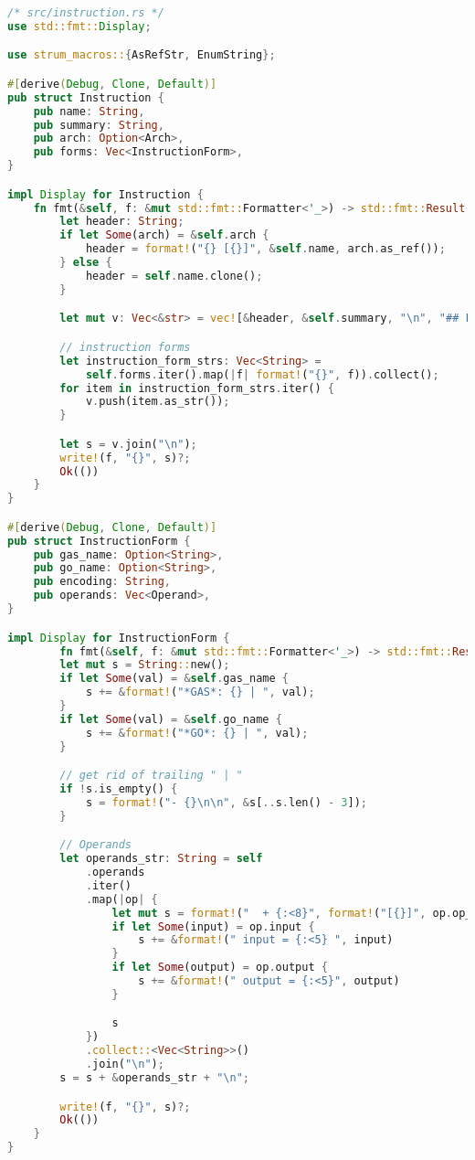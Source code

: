 \begin{lstlisting}[language=rust]
/* src/instruction.rs */
use std::fmt::Display;

use strum_macros::{AsRefStr, EnumString};

#[derive(Debug, Clone, Default)]
pub struct Instruction {
    pub name: String,
    pub summary: String,
    pub arch: Option<Arch>,
    pub forms: Vec<InstructionForm>,
}

impl Display for Instruction {
    fn fmt(&self, f: &mut std::fmt::Formatter<'_>) -> std::fmt::Result {
        let header: String;
        if let Some(arch) = &self.arch {
            header = format!("{} [{}]", &self.name, arch.as_ref());
        } else {
            header = self.name.clone();
        }

        let mut v: Vec<&str> = vec![&header, &self.summary, "\n", "## Forms", "\n"];

        // instruction forms
        let instruction_form_strs: Vec<String> =
            self.forms.iter().map(|f| format!("{}", f)).collect();
        for item in instruction_form_strs.iter() {
            v.push(item.as_str());
        }

        let s = v.join("\n");
        write!(f, "{}", s)?;
        Ok(())
    }
}

#[derive(Debug, Clone, Default)]
pub struct InstructionForm {
    pub gas_name: Option<String>,
    pub go_name: Option<String>,
    pub encoding: String,
    pub operands: Vec<Operand>,
}

impl Display for InstructionForm {
        fn fmt(&self, f: &mut std::fmt::Formatter<'_>) -> std::fmt::Result {
        let mut s = String::new();
        if let Some(val) = &self.gas_name {
            s += &format!("*GAS*: {} | ", val);
        }
        if let Some(val) = &self.go_name {
            s += &format!("*GO*: {} | ", val);
        }

        // get rid of trailing " | "
        if !s.is_empty() {
            s = format!("- {}\n\n", &s[..s.len() - 3]);
        }

        // Operands
        let operands_str: String = self
            .operands
            .iter()
            .map(|op| {
                let mut s = format!("  + {:<8}", format!("[{}]", op.op_type.as_ref()));
                if let Some(input) = op.input {
                    s += &format!(" input = {:<5} ", input)
                }
                if let Some(output) = op.output {
                    s += &format!(" output = {:<5}", output)
                }

                s
            })
            .collect::<Vec<String>>()
            .join("\n");
        s = s + &operands_str + "\n";

        write!(f, "{}", s)?;
        Ok(())
    }
}
\end{lstlisting}

